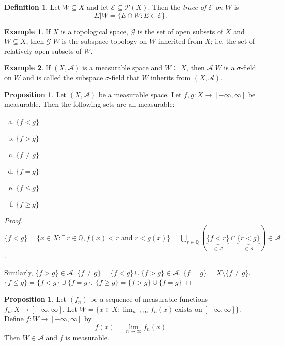 \documentclass{article}
\newcommand{\Q}{\mathbb{Q}}
\theoremstyle{definition}
\newtheorem{proposition}[theorem]{Proposition}
\newtheorem*{example}{Example}
\newtheorem*{definition}{Definition}
\begin{document}
\begin{definition}
Let $W \subseteq X$ and let $\mathscr{E} \subseteq \mathcal{P}(X)$. Then the \textit{trace of $\mathscr{E}$ on $W$} is
$$E | W = \{ E \cap W : E \in \mathscr{E}\}.$$
\end{definition}

\begin{example}
If $X$ is a topological space, $\mathscr{G}$ is the set of open subsets of $X$ and $W \subseteq X$, then $\mathscr{G} | W$ is the subspace topology on $W$ inherited from $X$; i.e. the set of relatively open subsets of $W$.
\end{example}

\begin{example}
If $(X,\mathscr{A})$ is a measurable space and $W \subseteq X$, then $\mathscr{A} | W$ is a $\sigma$-field on $W$ and is called the subspace $\sigma$-field that $W$ inherits from $(X,\mathscr{A})$.

\end{example}

\begin{proposition}
    Let $(X, \mathscr{A})$ be a measurable space. Let $f, g: X \longrightarrow [-\infty, \infty]$ be measurable. Then the following sets are all measurable:
    \begin{enumerate}[(a)]
        \item $\{ f < g \}$
        \item $\{ f > g \}$
        \item $\{ f \neq g \}$
        \item $\{ f = g \}$
        \item $\{ f \leq g \}$
        \item $\{ f \geq g \}$
    \end{enumerate}
\end{proposition}
\begin{proof}
    $\{f < g\} = \{x \in X : \exists\, r \in \Q, f(x) < r \text{ and } r < g(x)\} = \bigcup_{r\in\Q}( \underbrace{\{f < r\}}_{\in \mathscr{A}} \cap \underbrace{\{r < g\}}_{\in \mathscr{A}} ) \in \mathscr{A}$.
    
    Similarly, $\{f > g\} \in \mathscr{A}$. $\{f \neq g\} = \{f < g\} \cup \{f > g\} \in \mathscr{A}$. $\{f = g\} = X \setminus \{f \neq g\}$. $\{f \leq g\} = \{f < g\} \cup \{f = g\}$. $\{f \geq g\} = \{f > g\} \cup \{f = g\}$
\end{proof}

\begin{proposition}
Let $(f_n)$ be a sequence of measurable functions $f_n : X \to [-\infty,\infty]$. Let $W = \{x \in X : \lim_{n \to \infty} f_n (x) \ \text{exists on}\ [-\infty,\infty]\}$. Define $f: W \to [-\infty,\infty]$ by $$f(x) = \lim_{n \to \infty} f_n (x)$$
Then $W \in \mathscr{A}$ and $f$ is measurable.
\end{proposition}
\end{document}
